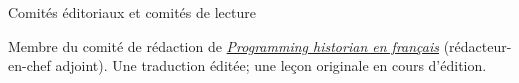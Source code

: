 










\begin{rubric}{Comités éditoriaux et comités de lecture}
            
                    \entry*[2021-]
                Membre du comité de rédaction de \href{https://programminghistorian.org/fr/}{\textit{Programming historian en
                            français}} (rédacteur-en-chef adjoint). Une traduction éditée; une
                    leçon originale en cours d'édition.\end{rubric}


